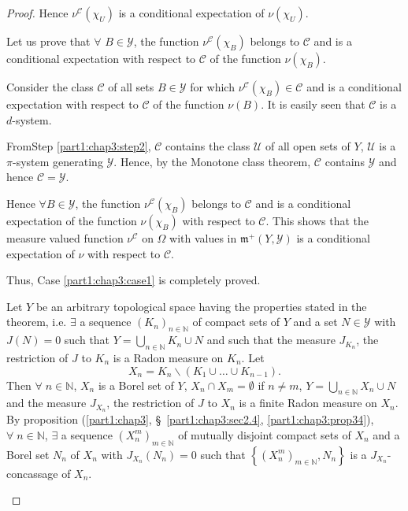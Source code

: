 \begin{proof}
Hence $\nu^\mathscr{C}(\chi_U)$ is a conditional expectation of
$\nu(\chi_U)$. 

\begin{step}\label{part1:chap3:step3}
Let us prove that $\forall$ \; $B \in \mathscr{Y}$, the function
$\nu^\mathscr{C}(\chi_B)$ belongs to $\mathscr{C}$ and is a
conditional expectation with respect to $\mathscr{C}$ of the function
$\nu(\chi_B)$. 
\end{step}

Consider the class $\mathscr{C}$ of all sets $B \in \mathscr{Y}$ for
which $\nu^\mathscr{C} (\chi_B) \in \mathscr{C}$ and is  a
conditional expectation with respect to $\mathscr{C}$ of the function
$\nu(B)$. It is easily seen that $\mathscr{C}$ is a $d$-system. 

From\pageoriginale Step \ref{part1:chap3:step2}, $\mathscr{C}$ contains the class
$\mathcal{U}$ of all open sets of $Y$, $\mathcal{U}$ is a $\pi$-system
generating $\mathscr{Y}$. Hence, by the Monotone class theorem,
$\mathscr{C}$ contains $\mathscr{Y}$ and hence $\mathscr{C} =
\mathscr{Y}$. 

Hence $\forall B \in\mathscr{Y}$, the function $\nu^\mathscr{C}
(\chi_B)$ belongs to $\mathscr{C}$ and is a conditional expectation of
the function  $\nu(\chi_B)$ with respect to $\mathscr{C}$. This shows
that the measure valued function $\nu^\mathscr{C}$ on $\Omega$ with
values in $\mathfrak{m}^+ (Y, \mathscr{Y})$ is a conditional
expectation of $\nu$ with respect to $\mathscr{C}$. 

Thus, Case \ref{part1:chap3:case1} is completely proved. 

\begin{case}\label{part1:chap3:case2}
Let $Y$ be an arbitrary topological space having the properties stated
in the theorem, i.e. $\exists$ a sequence $(K_n)_{n \in\mathbb{N}}$ of
compact sets  of $Y$ and a set $N \in \mathscr{Y}$ with $J(N) =0$ such
that $Y = \bigcup\limits_{n \in \mathbb{N}} K_n \cup N$ and such that
the measure $J_{K_n}$, the restriction of $J$ to $K_n$ is a Radon
measure on $K_n$. Let 
$$
X_n = K_n \backslash (K_1 \cup \ldots \cup K_{n -1}). 
$$
Then $\forall \; n \in \mathbb{N}$, $X_n$ is a Borel set of $Y$, $X_n
\cap X_m = \emptyset$ if $n \neq m$, $Y = \bigcup\limits_{n
  \in\mathbb{N}} X_n \cup N$ and the measure $J_{X_n}$, the
restriction of $J$ to $X_n$ is a finite Radon measure on $X_n$. By
proposition (\ref{part1:chap3}, \S\ \ref{part1:chap3:sec2.4},
\ref{part1:chap3:prop34}), $\forall \; n \in\mathbb{N}$, 
$\exists$ a sequence $(X^m_n)_{m \in\mathbb{N}}$ of mutually disjoint
compact sets of $X_n$ and a Borel set $N_n$ of $X_n$ with
$J_{X_n}(N_n) = 0$ such that $\left\{(X^m_n)_{m \in \mathbb{N}}, N_n
\right\}$ is a $J_{X_n}$-concassage of $X_n$. 
\end{case}


\end{proof}
